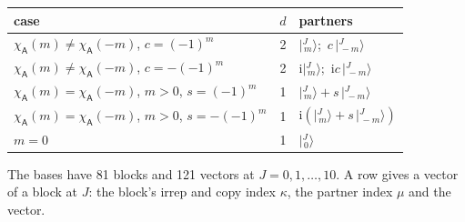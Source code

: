 \documentclass[10pt,a4paper]{article}
\numberwithin{equation}{section}
\newcommand{\grp}[1]{\mathsf{#1}}
\newcommand{\iunit}{\mathrm{i}}
\newcommand{\chiA}{\chi_{\grp{A}}}
\newcommand{\mult}{\kappa}
\newcommand{\intx}{\mu}
\newcommand{\jm}[2]{\bigl\lvert{}^{#1}_{\,#2}\bigr\rangle}
\begin{document}
\begin{center}\begin{tabular}{@{}lrl@{}}\toprule
case & $d$ & partners\\\midrule
$\chiA(m) \ne \chiA(-m)$, $c = (-1)^m$ & 2 & $\jm{J}{m}$;\ $c\,\jm{J}{-m}$\\
$\chiA(m) \ne \chiA(-m)$, $c = -(-1)^m$ & 2 & $\iunit\jm{J}{m}$;\ $\iunit c\,\jm{J}{-m}$\\
$\chiA(m) = \chiA(-m)$, $m > 0$, $s = (-1)^m$ & 1 & $\jm{J}{m} + s\,\jm{J}{-m}$\\
$\chiA(m) = \chiA(-m)$, $m > 0$, $s = -(-1)^m$ & 1 & $\iunit(\jm{J}{m} + s\,\jm{J}{-m})$\\
$m = 0$ & 1 & $\jm{J}{0}$\\
\bottomrule\end{tabular}\end{center}
The bases have 81 blocks and 121 vectors at $J = 0, 1, \dots, 10$. \label{n:head.vector}A row gives a vector of a block at $J$: the block's irrep and copy index $\mult$, the partner index $\intx$ and the vector.
\end{document}
